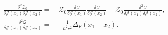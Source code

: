 
\begin{align}
 \frac{\delta^2\mathcal Z_0}
 {\delta\mathcal J(x_1)\delta\mathcal J(x_2)}
 =&\;\mathcal Z_0
 \frac{\delta\mathscr Q}{\delta\mathcal J(x_1)}
 \frac{\delta\mathscr Q}{\delta\mathcal J(x_2)}
 +\mathcal Z_0
 \frac{\delta^2\mathscr Q}
 {\delta\mathcal J(x_1)\delta\mathcal J(x_2)},\\
 \frac{\delta^2\mathscr Q}
 {\delta\mathcal J(x_1)\delta\mathcal J(x_2)}
 =&-\frac{1}{\hbar^2c^2}\Delta_F(x_1-x_2).
 \label{eq:qft-QJ-second-derivative-dp6}
\end{align}

